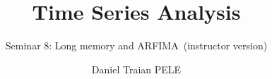 \title[Time Series Analysis]{Time Series Analysis}
\subtitle{Seminar 8: Long memory and ARFIMA\ifsolutions\ (instructor version)\fi}
\author[D.T. Pele]{Daniel Traian PELE}
\date{}

\providecommand{\tsaapplink}[3]{\hypertarget{#2}{}\hyperlink{#1}{\beamergotobutton{#3}}}  %
\providecommand{\tsaappback}[2]{\begin{tikzpicture}[remember picture,overlay]\node[anchor=south east] at ([xshift=-3mm,yshift=7mm]current page.south east){\hyperlink{#1}{\beamerreturnbutton{#2}}};\end{tikzpicture}}  %
\providecommand{\tsachlink}[2]{\href{#1}{#2}}  %
\providecommand{\tsachlinkt}[2]{\href{#1}{\usebeamercolor[fg]{frametitle}#2}}  %


